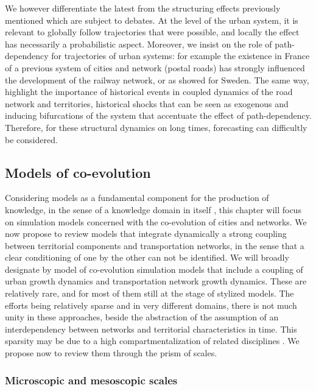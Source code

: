 \documentclass[11pt]{article}
\begin{document}
We however differentiate the latest from the structuring effects previously mentioned which are subject to debates. At the level of the urban system, it is relevant to globally follow trajectories that were possible, and locally the effect has necessarily a probabilistic aspect. Moreover, we insist on the role of path-dependency for trajectories of urban systems: for example the existence in France of a previous system of cities and network (postal roads) has strongly influenced the development of the railway network, or as \cite{berger2017locomotives} showed for Sweden. The same way, \cite{doi:10.1068/b39089} highlight the importance of historical events in coupled dynamics of the road network and territories, historical shocks that can be seen as exogenous and inducing bifurcations of the system that accentuate the effect of path-dependency. Therefore, for these structural dynamics on long times, forecasting can difficultly be considered.


\subsection{Models of co-evolution}

Considering models as a fundamental component for the production of knowledge, in the sense of a knowledge domain in itself \citep{raimbault2017applied}, this chapter will focus on simulation models concerned with the co-evolution of cities and networks. We now propose to review models that integrate dynamically a strong coupling between territorial components and transportation networks, in the sense that a clear conditioning of one by the other can not be identified. We will broadly designate by model of co-evolution simulation models that include a coupling of urban growth dynamics and transportation network growth dynamics. These are relatively rare, and for most of them still at the stage of stylized models. The efforts being relatively sparse and in very different domains, there is not much unity in these approaches, beside the abstraction of the assumption of an interdependency between networks and territorial characteristics in time. This sparsity may be due to a high compartmentalization of related disciplines \citep{raimbault2017models}. We propose now to review them through the prism of scales.



\subsubsection{Microscopic and mesoscopic scales}
\end{document}
